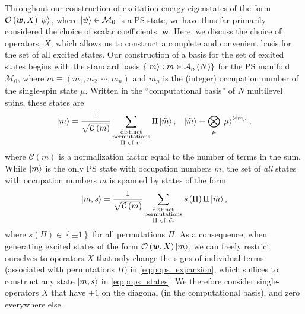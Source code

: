 \documentclass[nofootinbib,notitlepage,11pt]{revtex4-2}
\renewcommand{\t}{\text} %
\newcommand{\f}[2]{\dfrac{#1}{#2}} %
\newcommand{\p}[1]{\left(#1\right)} %
\renewcommand{\set}[1]{\left\{#1\right\}} %
\newcommand{\m}{\bm} %
\newcommand{\1}{\mathds{1}}
\newcommand{\A}{\mathcal{A}}
\newcommand{\C}{\mathcal{C}}
\newcommand{\M}{\mathcal{M}}
\renewcommand{\O}{\mathcal{O}}
\begin{document}
Throughout our construction of excitation energy eigenstates of the form $\O\p{\m w,X}\ket\psi$, where $\ket\psi\in\M_0$ is a PS state, we have thus far primarily considered the choice of scalar coefficients, $\m w$.
Here, we discuss the choice of operators, $X$, which allows us to construct a complete and convenient basis for the set of all excited states.
Our construction of a basis for the set of excited states begins with the standard basis $\set{\ket{m}:m\in\A_n\p{N}}$ for the PS manifold $\M_0$, where $m\equiv\p{m_1,m_2,\cdots,m_n}$ and $m_\mu$ is the (integer) occupation number of the single-spin state $\mu$.
Written in the ``computational basis'' of $N$ multilevel spins, these states are
\begin{align}
  \ket{m} =
  \f1{\sqrt{\C\p{m}}}
  \sum_{\substack{\t{distinct}\\\t{permutations}\\\Pi~\t{of}~\tilde m}}
  \Pi \ket{\tilde m},
  &&
  \ket{\tilde m} \equiv \bigotimes_\mu \ket{\mu}^{\otimes m_\mu},
  \label{eq:pops_expansion}
\end{align}
where $\C\p{m}$ is a normalization factor equal to the number of terms in the sum.
While $\ket{m}$ is the only PS state with occupation numbers $m$, the set of {\it all} states with occupation numbers $m$ is spanned by states of the form
\begin{align}
  \ket{m,s} = \f1{\sqrt{\C\p{m}}}
  \sum_{\substack{\t{distinct}\\\t{permutations}\\\Pi~\t{of}~\tilde m}}
  s\p{\Pi} \Pi \ket{\tilde m},
  \label{eq:pops_states}
\end{align}
where $s\p{\Pi}\in\set{\pm1}$ for all permutations $\Pi$.
As a consequence, when generating excited states of the form $\O\p{\m w,X}\ket{m}$, we can freely restrict ourselves to operators $X$ that only change the signs of individual terms (associated with permutations $\Pi$) in \eqref{eq:pops_expansion}, which suffices to construct any state $\ket{m,s}$ in \eqref{eq:pops_states}.
We therefore consider single-operators $X$ that have $\pm1$ on the diagonal (in the computational basis), and zero everywhere else.
\end{document}
